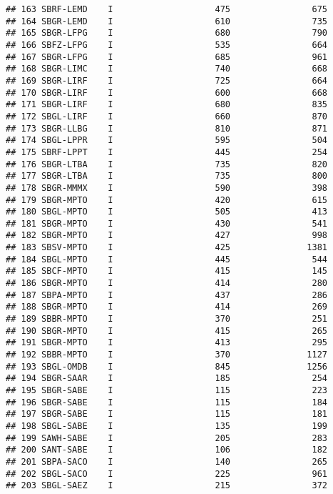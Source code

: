 \documentclass[
]{article}
\begin{document}
\begin{verbatim}
## 163 SBRF-LEMD    I                    475                675
## 164 SBGR-LEMD    I                    610                735
## 165 SBGR-LFPG    I                    680                790
## 166 SBFZ-LFPG    I                    535                664
## 167 SBGR-LFPG    I                    685                961
## 168 SBGR-LIMC    I                    740                668
## 169 SBGR-LIRF    I                    725                664
## 170 SBGR-LIRF    I                    600                668
## 171 SBGR-LIRF    I                    680                835
## 172 SBGL-LIRF    I                    660                870
## 173 SBGR-LLBG    I                    810                871
## 174 SBGL-LPPR    I                    595                504
## 175 SBRF-LPPT    I                    445                254
## 176 SBGR-LTBA    I                    735                820
## 177 SBGR-LTBA    I                    735                800
## 178 SBGR-MMMX    I                    590                398
## 179 SBGR-MPTO    I                    420                615
## 180 SBGL-MPTO    I                    505                413
## 181 SBGR-MPTO    I                    430                541
## 182 SBGR-MPTO    I                    427                998
## 183 SBSV-MPTO    I                    425               1381
## 184 SBGL-MPTO    I                    445                544
## 185 SBCF-MPTO    I                    415                145
## 186 SBGR-MPTO    I                    414                280
## 187 SBPA-MPTO    I                    437                286
## 188 SBGR-MPTO    I                    414                269
## 189 SBBR-MPTO    I                    370                251
## 190 SBGR-MPTO    I                    415                265
## 191 SBGR-MPTO    I                    413                295
## 192 SBBR-MPTO    I                    370               1127
## 193 SBGL-OMDB    I                    845               1256
## 194 SBGR-SAAR    I                    185                254
## 195 SBGR-SABE    I                    115                223
## 196 SBGR-SABE    I                    115                184
## 197 SBGR-SABE    I                    115                181
## 198 SBGL-SABE    I                    135                199
## 199 SAWH-SABE    I                    205                283
## 200 SANT-SABE    I                    106                182
## 201 SBPA-SACO    I                    140                265
## 202 SBGL-SACO    I                    225                961
## 203 SBGL-SAEZ    I                    215                372

\end{verbatim}
\end{document}
